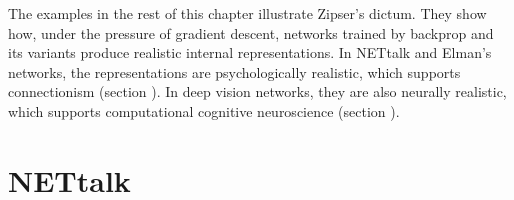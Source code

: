 The examples in the rest of this chapter illustrate Zipser's dictum. They show how, under the pressure of gradient descent, networks trained by backprop and its variants produce realistic internal representations. In NETtalk and Elman's networks, the representations are psychologically realistic, which supports connectionism (section ). In deep vision networks, they are also neurally realistic, which supports computational cognitive neuroscience (section ).



\section{NETtalk}


